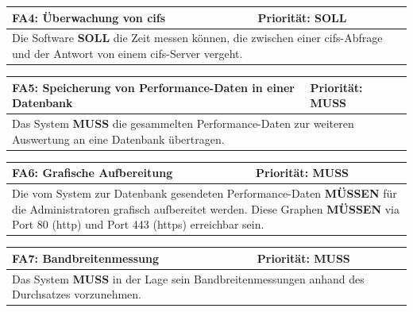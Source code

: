 \documentclass[titlepage]{report}
\begin{document}
\begin{center}
\begin{tabular}{p{}>{\raggedleft\arraybackslash}p{}}\toprule
    \textbf{FA4: Überwachung von \gls{cifs} } & \textbf{Priorität: SOLL} \\\midrule
	\multicolumn{2}{p{\textwidth-\tabcolsep}}{%
    Die Software \textbf{SOLL} die Zeit messen können, die
    zwischen einer \gls{cifs}-Abfrage und der Antwort von einem
    \gls{cifs}\hyp{}Server vergeht.}\\\bottomrule
\end{tabular}
    \label{table:FA4}
\end{center}
\begin{center}
\begin{tabular}{p{}>{\raggedleft\arraybackslash}p{}}\toprule
    \textbf{FA5: Speicherung von Performance-Daten in einer Datenbank } & \textbf{Priorität: MUSS} \\\midrule
	\multicolumn{2}{p{\textwidth-\tabcolsep}}{%
        Das System \textbf{MUSS} die gesammelten Performance-Daten
        zur weiteren Auswertung an eine Datenbank übertragen.}\\\bottomrule
\end{tabular}
    \label{table:FA5}
\end{center}
\begin{center}
\begin{tabular}{p{}>{\raggedleft\arraybackslash}p{}}\toprule
    \textbf{FA6: Grafische Aufbereitung } & \textbf{Priorität: MUSS} \\\midrule
	\multicolumn{2}{p{\textwidth-\tabcolsep}}{%
        Die vom System zur Datenbank gesendeten Performance-Daten
        \textbf{MÜSSEN} für die Administratoren grafisch
        aufbereitet werden.
        Diese Graphen \textbf{MÜSSEN} via Port 80 (\gls{http})
        und Port 443 (\gls{https}) erreichbar sein.
        }\\\bottomrule
\end{tabular}
    \label{table:FA6}
\end{center}
\begin{center}
\begin{tabular}{p{}>{\raggedleft\arraybackslash}p{}}\toprule
    \textbf{FA7: Bandbreitenmessung } & \textbf{Priorität: MUSS} \\\midrule
	\multicolumn{2}{p{\textwidth-\tabcolsep}}{%
        Das System \textbf{MUSS} in der Lage sein Bandbreitenmessungen anhand des
        Durchsatzes vorzunehmen.
                }\\\bottomrule
\end{tabular}
    \label{table:FA7}
\end{center}
\end{document}
